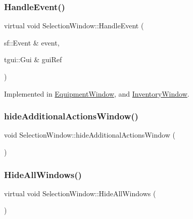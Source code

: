 \subsubsection{\texorpdfstring{Handle\+Event()}{HandleEvent()}}
{\footnotesize\ttfamily virtual void Selection\+Window\+::\+Handle\+Event (\begin{DoxyParamCaption}\item[{sf\+::\+Event \&}]{event,  }\item[{tgui\+::\+Gui \&}]{gui\+Ref }\end{DoxyParamCaption})\hspace{0.3cm}{\ttfamily [pure virtual]}}



Implemented in \mbox{\hyperlink{class_equipment_window_aea251bbf9967a0f39ccca5df854adcbe}{Equipment\+Window}}, and \mbox{\hyperlink{class_inventory_window_ad023d9091385b9829673f6f592dd44ea}{Inventory\+Window}}.

\mbox{\label{class_selection_window_a1008dc5a1719e62a1017d0603f7560c1}} 
\subsubsection{\texorpdfstring{hide\+Additional\+Actions\+Window()}{hideAdditionalActionsWindow()}}
{\footnotesize\ttfamily void Selection\+Window\+::hide\+Additional\+Actions\+Window (\begin{DoxyParamCaption}{ }\end{DoxyParamCaption})}

\mbox{\label{class_selection_window_a1d0561e5fbd751025c71484589f83841}} 
\subsubsection{\texorpdfstring{Hide\+All\+Windows()}{HideAllWindows()}}
{\footnotesize\ttfamily virtual void Selection\+Window\+::\+Hide\+All\+Windows (\begin{DoxyParamCaption}{ }\end{DoxyParamCaption})\hspace{0.3cm}{\ttfamily [pure virtual]}}



